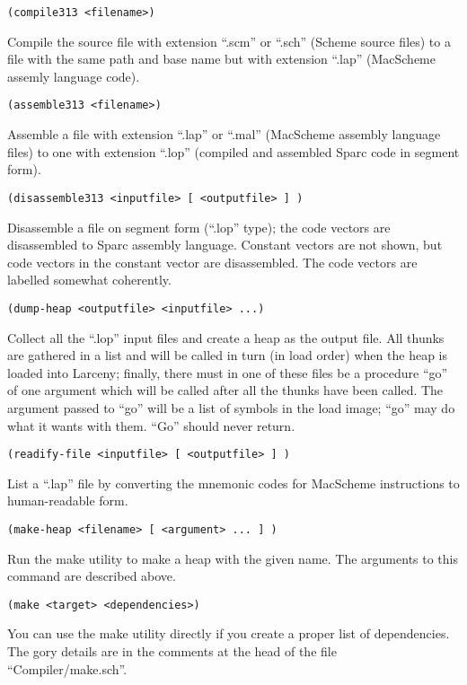 \begin{description}
\item {\verb+(compile313 <filename>)+}

Compile the source file with extension ``.scm'' or ``.sch'' (Scheme source
files) to a file with the same path and base name but with extension
``.lap'' (MacScheme assemly language code).

\item {\verb+(assemble313 <filename>)+}

Assemble a file with extension ``.lap'' or ``.mal'' (MacScheme assembly
language files) to one with extension ``.lop'' (compiled and assembled
Sparc code in segment form).

\item {\verb+(disassemble313 <inputfile> [ <outputfile> ] )+}

Disassemble a file on segment form (``.lop'' type); the code vectors are
disassembled to Sparc assembly language. Constant vectors are not shown,
but code vectors in the constant vector are disassembled. The code vectors
are labelled somewhat coherently.

\item {\verb+(dump-heap <outputfile> <inputfile> ...)+}

Collect all the ``.lop'' input files and create a heap as the output file.
All thunks are gathered in a list and will be called in turn (in load order)
when the heap is loaded into Larceny; finally, there must in one of these
files be a procedure ``go'' of one argument which will be called after all
the thunks have been called. The argument passed to ``go'' will be a list
of symbols in the load image; ``go'' may do what it wants with them.
``Go'' should never return.

\item {\verb+(readify-file <inputfile> [ <outputfile> ] )+}

List a ``.lap'' file by converting the mnemonic codes for MacScheme 
instructions to human-readable form.

\item {\verb+(make-heap <filename> [ <argument> ... ] )+}

Run the make utility to make a heap with the given name. The arguments to
this command are described above.

\item {\verb+(make <target> <dependencies>)+}

You can use the make utility directly if you create a proper list of
dependencies. The gory details are in the comments at the head of the file
``Compiler/make.sch''.

\end{description}

